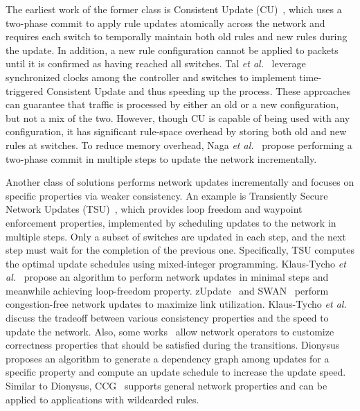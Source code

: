   
The earliest work of the former class is Consistent Update
(CU)~\cite{CU}, which uses a two-phase commit to apply rule updates
atomically across the network and requires each switch to temporally
maintain both old rules and new rules during the update.  In addition,
a new rule configuration cannot be applied to packets until it is
confirmed as having reached all switches. Tal \textit{et al.}~\cite{timedcu} leverage synchronized clocks among the controller and switches to implement time-triggered Consistent Update and thus speeding up the process. These approaches can guarantee that traffic is processed by either an old or a new configuration, but not a mix of the two. However, though CU is capable of being used with any configuration, it has significant rule-space overhead by storing both old and new rules at switches. To reduce memory overhead, Naga \textit{et al.}~\cite{incrementalcu} propose performing a two-phase commit in multiple steps to update the network incrementally. 

Another class of solutions performs network updates incrementally and focuses on specific properties via weaker consistency. An example is Transiently Secure Network Updates
(TSU)~\cite{tsu}, which provides loop freedom and waypoint enforcement properties, implemented by scheduling updates to the network in multiple steps.
Only a subset of switches are updated in each step, and the next step must wait for the completion of the previous one. Specifically, TSU computes the optimal update schedules using mixed-integer programming. Klaus-Tycho \textit{et al.}~\cite{lfupdate} propose an algorithm to perform network updates in minimal steps and meanwhile achieving loop-freedom property. zUpdate~\cite{zupdate} and SWAN~\cite{swan} perform congestion-free network updates to maximize link utilization. Klaus-Tycho \textit{et al.}~\cite{dlb} discuss the tradeoff between various consistency properties and the speed to update the network. Also, some works~\cite{dionysus, ccg} allow network operators to customize correctness properties that should be satisfied during the transitions. Dionysus~\cite{dionysus} proposes an algorithm to generate a dependency graph among updates for a specific property and compute an update schedule to increase the update speed. Similar to Dionysus, CCG~\cite{ccg} supports general network properties and can be applied to applications with wildcarded rules.

